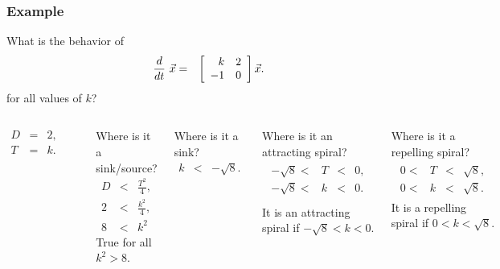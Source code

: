 \begin{frame}
  \frametitle{Example}

  What is the behavior of
  \begin{eqnarray*}
    \deriv{~}{t} \vec{x} & = & \arrayTwo{k}{2}{-1}{0} \vec{x}.
  \end{eqnarray*}
  for all values of $k$?


  \begin{columns}
     {
      \begin{eqnarray*}
        D & = & 2, \\
        T & = & k.
      \end{eqnarray*}

    \centerline{\includegraphics[width=3cm]{img/traceDeterminantExample6}}
    }


     { Where is it a sink/source?
      \begin{eqnarray*}
        D & < & \frac{T^2}{4}, \\
        2 & < & \frac{k^2}{4}, \\
        8 & < & k^2
      \end{eqnarray*}
      True for all $k^2>8$.  }


     { Where is it a sink?
      \begin{eqnarray*}
        k & < & -\sqrt{8}.
      \end{eqnarray*}
    }

     { Where is it an attracting spiral?
      \begin{eqnarray*}
        \begin{array}{rcccl}
          -\sqrt{8} < & T & < & 0, \\
          -\sqrt{8} < & k & < & 0. \\
        \end{array}
      \end{eqnarray*}
      It is an attracting spiral if $-\sqrt{8}<k<0$.  }

     { Where is it a repelling spiral?
      \begin{eqnarray*}
        \begin{array}{rcccl}
          0 < & T & < & \sqrt{8}, \\
          0 < & k & < & \sqrt{8}.
        \end{array}
      \end{eqnarray*}
      It is a repelling spiral if $0<k<\sqrt{8}$.  }


\end{columns}
\end{frame}
